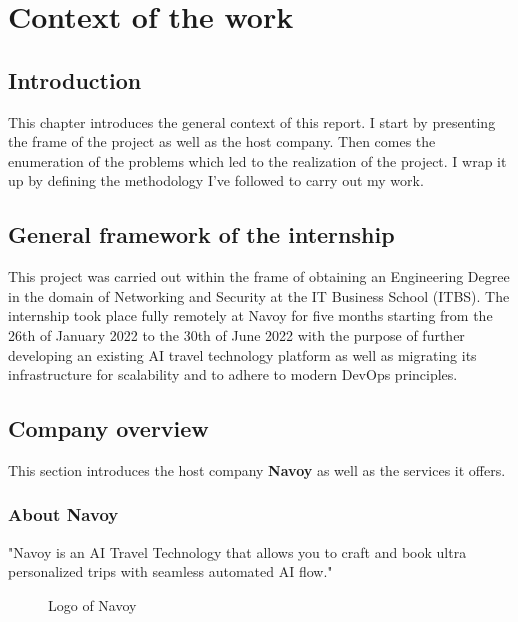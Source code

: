 \chapter{Context of the work}
\minitoc
\newpage

\setcounter{secnumdepth}{0} %
\section{Introduction}
This chapter introduces the general context of this report.
I start by presenting the frame of the project as well as the host company.
Then comes the enumeration of the problems which led to the realization of the project.
I wrap it up by defining the methodology I've followed to carry out my work.

\setcounter{secnumdepth}{2} %

\section{General framework of the internship}
This project was carried out within the frame of obtaining an Engineering Degree in the domain of Networking and Security at the IT Business School (ITBS).
The internship took place fully remotely at Navoy for five months starting from the 26th of January 2022 to the 30th of June 2022 with the purpose of further developing an existing AI travel technology platform as well as migrating its infrastructure for scalability and to adhere to modern DevOps principles.

\section{Company overview}
This section introduces the host company {\bf Navoy} as well as the services it offers.
\subsection{About Navoy}
"Navoy is an AI Travel Technology that allows you to craft and book ultra personalized trips with seamless automated AI flow." \cite{about-navoy}
\begin{figure}[H]
  \centering
  \caption{Logo of Navoy}
  \label{fig:logo-of-navoy}
\end{figure}

